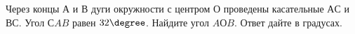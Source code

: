 \begin{ex}
	\begin{condition}
		Через концы \( А \) и \( В \) дуги окружности с центром \( О  \) проведены касательные \( АС \)  и \( ВС \). Угол \( СAB \)  равен \( 32\degree\). Найдите угол \( AОB \). Ответ дайте в градусах.
	\end{condition}
\end{ex}